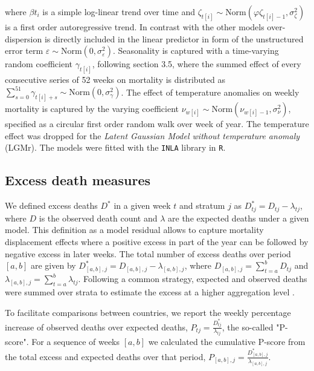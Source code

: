 \documentclass[12pt]{article}
\begin{document}
where $\beta t_i$ is a simple log-linear trend over time and $\zeta_{t[i]} \sim \text{Norm}(\varphi \zeta_{t[i]-1}, \sigma^2_\zeta)$ is a first order autoregressive trend. In contrast with the other models over-dispersion is directly included in the linear predictor in form of the unstructured error term $\varepsilon \sim \text{Norm}(0, \sigma^2_\varepsilon)$. Seasonality is captured with a time-varying random coefficient $\gamma_{t[i]}$, following \cite{Rue2005} section 3.5, where the summed effect of every consecutive series of 52 weeks on mortality is distributed as $\sum_{s=0}^{51} \gamma_{t[i]+s} \sim \text{Norm}(0, \sigma^2_\gamma)$. The effect of temperature anomalies on weekly mortality is captured by the varying coefficient $\nu_{w[i]} \sim \text{Norm}(\nu_{w[i]-1}, \sigma^2_\nu)$, specified as a circular first order random walk over week of year. The temperature effect was dropped for the \emph{Latent Gaussian Model without temperature anomaly} (LGMr). The models were fitted with the \texttt{INLA} library \cite{Rue2009, Rue2021} in \texttt{R}.

\subsection*{Excess death measures}

We defined excess deaths $D^*$ in a given week $t$ and stratum $j$ as
$D_{tj}^* = D_{tj}-\lambda_{tj}$,
where $D$ is the observed death count and $\lambda$ are the expected deaths under a given model. This definition as a model residual allows to capture mortality displacement effects where a positive excess in part of the year can be followed by negative excess in later weeks. The total number of excess deaths over period $[a,b]$ are given by
$D_{[a,b], j}^* = D_{[a,b], j} - \lambda_{[a,b], j}$,
where
$D_{[a,b], j}=\sum_{t=a}^b D_{tj}$ and
$\lambda_{[a,b], j}=\sum_{t=a}^b \lambda_{tj}$.
Following a common strategy, expected and observed deaths were summed over strata to estimate the excess at a higher aggregation level \citep{Barnard2020, Aburto2021, Kontis2020, Weinberger2020}.

To facilitate comparisons between countries, we report the weekly percentage increase of observed deaths over expected deaths,
$P_{tj}=\frac{D_{tj}^*}{\lambda_{tj}}$,
the so-called "P-score". For a sequence of weeks $[a,b]$ we calculated the cumulative P-score from the total excess and expected deaths over that period,
$P_{[a,b], j}=\frac {D_{[a,b], j}^*} {\lambda_{[a,b], j}}$.
\end{document}
